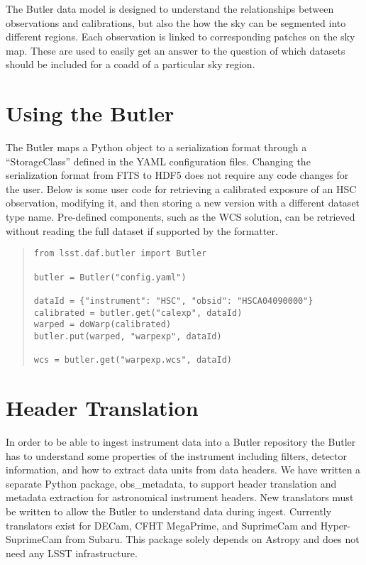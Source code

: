 \documentclass[11pt,twoside]{article}
\begin{document}
The Butler  data model is designed to understand the relationships between observations and calibrations, but also the how the sky can be segmented into different regions.
Each observation is linked to corresponding patches on the sky map.
These are used to easily get an answer to the question of which datasets should be included for a coadd of a particular sky region.

\section{Using the Butler}

The Butler maps a Python object to a serialization format through a ``StorageClass'' defined in the YAML configuration files.
Changing the serialization format from FITS to HDF5 does not require any code changes for the user.
Below is some user code for retrieving a calibrated exposure of an HSC observation, modifying it, and then storing a new version with a different dataset type name.
Pre-defined components, such as the WCS solution, can be retrieved without reading the full dataset if supported by the formatter.

\begin{quote}
\begin{small}
\begin{verbatim}
from lsst.daf.butler import Butler

butler = Butler("config.yaml")

dataId = {"instrument": "HSC", "obsid": "HSCA04090000"}
calibrated = butler.get("calexp", dataId)
warped = doWarp(calibrated)
butler.put(warped, "warpexp", dataId)

wcs = butler.get("warpexp.wcs", dataId)
\end{verbatim}
\end{small}
\end{quote}

\section{Header Translation}

In order to be able to ingest instrument data into a Butler repository the Butler has to understand some properties of the instrument including filters, detector information, and how to extract data units from data headers.
We have written a separate Python package, obs\_metadata, to support header translation and metadata extraction for astronomical instrument headers.
New translators must be written to allow the Butler to understand data during ingest.
Currently translators exist for DECam, CFHT MegaPrime, and SuprimeCam and Hyper-SuprimeCam from Subaru.
This package solely depends on Astropy and does not need any LSST infrastructure.
\end{document}
